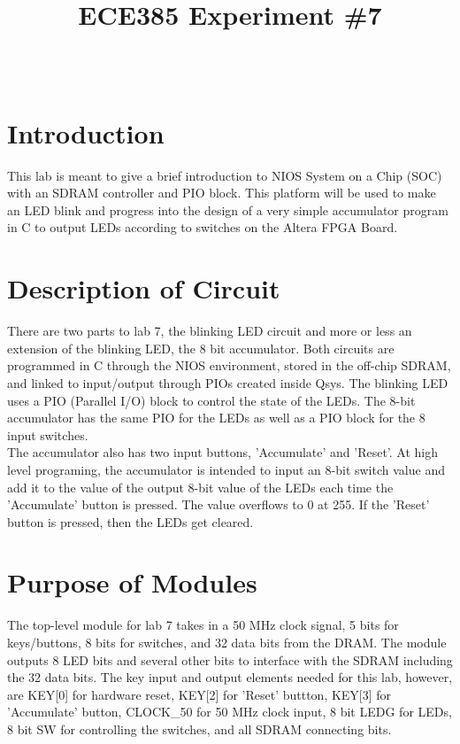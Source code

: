 \documentclass[journal, twocolumn, final,11pt,letterpaper]{IEEEtran}
\title{ECE385 Experiment \#7
	}
\author{
\IEEEauthorblockN{Eric Meyers, Ryan Helsdingen}\\
\IEEEauthorblockA{Section ABG; TAs: Ben Delay, Shuo Liu \\
March 16th, 2016 \\
emeyer7, helsdin2}}
\begin{document}
	
\maketitle
\singlespacing

\section{Introduction}
This lab is meant to give a brief introduction to NIOS System on a Chip (SOC) with an SDRAM controller and PIO block.  This platform will be used to make an LED blink and progress into the design of a very simple accumulator program in C to output LEDs according to switches on the Altera FPGA Board.\\

\section{Description of Circuit}
There are two parts to lab 7, the blinking LED circuit and more or less an extension of the blinking LED, the 8 bit accumulator.  Both circuits are programmed in C through the NIOS environment, stored in the off-chip SDRAM, and linked to input/output through PIOs created inside Qsys.  The blinking LED uses a PIO (Parallel I/O) block to control the state of the LEDs.  The 8-bit accumulator has the same PIO for the LEDs as well as a PIO block for the 8 input switches.\\

The accumulator also has two input buttons, 'Accumulate' and 'Reset'.  At high level programing, the accumulator is intended to input an 8-bit switch value and add it to the value of the output 8-bit value of the LEDs each time the 'Accumulate' button is pressed.  The value overflows to 0 at 255.  If the 'Reset' button is pressed, then the LEDs get cleared.\\
  

\section{Purpose of Modules}
The top-level module for lab 7 takes in a 50 MHz clock signal, 5 bits for keys/buttons, 8 bits for switches, and 32 data bits from the DRAM.  The module outputs 8 LED bits and several other bits to interface with the SDRAM including the 32 data bits.  The key input and output elements needed for this lab, however, are KEY[0] for hardware reset, KEY[2] for 'Reset' buttton, KEY[3] for 'Accumulate' button, CLOCK\_50 for 50 MHz clock input, 8 bit LEDG for LEDs, 8 bit SW for controlling the switches, and all SDRAM connecting bits.\\   
\end{document}
